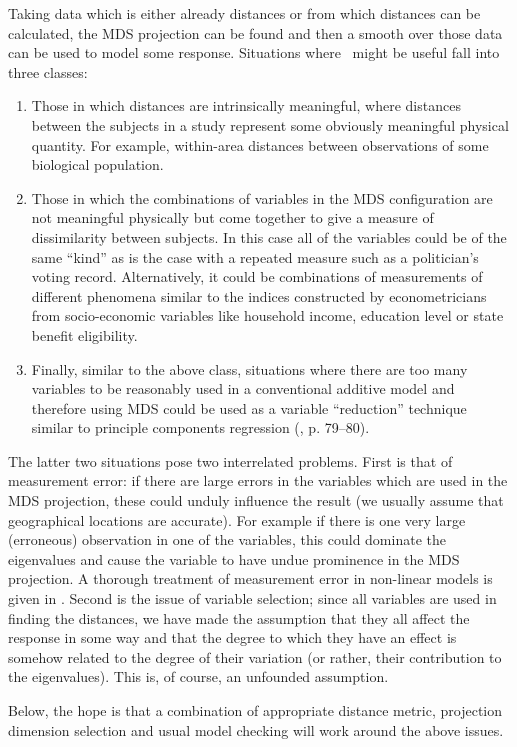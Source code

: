Taking data which is either already distances or from which distances can be calculated, the MDS projection can be found and then a smooth over those data can be used to model some response. Situations where \mdsds\ might be useful fall into three classes: 
\begin{enumerate}
\item Those in which distances are intrinsically meaningful, where distances between the subjects in a study represent some obviously meaningful physical quantity. For example, within-area distances  between observations of some biological population.
\item Those in which the combinations of variables in the MDS configuration are not meaningful physically but come together to give a measure of dissimilarity between subjects. In this case all of the variables could be of the same ``kind'' as is the case with a repeated measure such as a politician's voting record. Alternatively, it could be combinations of measurements of different phenomena similar to the indices constructed by econometricians from socio-economic variables like household income, education level or state benefit eligibility.
\item Finally, similar to the above class, situations where there are too many variables to be reasonably used in a conventional additive model and therefore using MDS could be used as a variable ``reduction'' technique similar to principle components regression (\cite{elements}, p. 79--80).
\end{enumerate}
The latter two situations pose two interrelated problems. First is that of measurement error: if there are large errors in the variables which are used in the MDS projection, these could unduly influence the result (we usually assume that geographical locations are accurate). For example if there is one very large (erroneous) observation in one of the variables, this could dominate the eigenvalues and cause the variable to have undue prominence in the MDS projection. A thorough treatment of measurement error in non-linear models is given in \cite{measurementerror}. Second is the issue of variable selection; since all variables are used in finding the distances, we have made the assumption that they all affect the response in some way and that the degree to which they have an effect is somehow related to the degree of their variation (or rather, their contribution to the eigenvalues). This is, of course, an unfounded assumption.

Below, the hope is that a combination of appropriate distance metric, projection dimension selection and usual model checking will work around the above issues.

